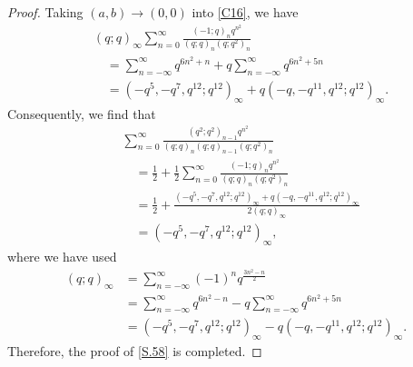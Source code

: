 \documentclass[reqno,12pt]{amsart}
\theoremstyle{remark}
\numberwithin{equation}{section}
\begin{document}
\begin{proof}
Taking $\left(a,b\right)\to\left(0,0\right)$ into \eqref{C16}, we have
\begin{align}
&\left(q;q\right)_{\infty}\sum_{n=0}^{\infty}
\frac{\left(-1;q\right)_nq^{n^2}}
{\left(q;q\right)_n\left(q;q^2\right)_n}\nonumber\\
&\quad=
\sum_{n=-\infty}^{\infty}q^{6n^2+n}+q\sum_{n=-\infty}^{\infty}q^{6n^2+5n}\nonumber\\
&\quad=
\left(-q^5,-q^7,q^{12};q^{12}\right)_{\infty}
+q\left(-q,-q^{11},q^{12};q^{12}\right)_{\infty}.
\label{equ5}
\end{align}
Consequently, we find that
\begin{align*}
&\sum_{n=0}^{\infty}\frac{\left(q^2;q^2\right)_{n-1}q^{n^2}}
{\left(q;q\right)_n\left(q;q\right)_{n-1}\left(q;q^2\right)_n}\nonumber\\
&\quad=\frac{1}{2}+\frac{1}{2}\sum_{n=0}^{\infty}
\frac{\left(-1;q\right)_nq^{n^2}}{\left(q;q\right)_n
\left(q;q^2\right)_n}\nonumber\\
&\quad=\frac{1}{2}+\frac{\left(-q^5,-q^7,q^{12};q^{12}\right)_{\infty}
+q\left(-q,-q^{11},q^{12};q^{12}\right)_{\infty}}{2\left(q;q\right)_{\infty}}\\
&\quad=\left(-q^5,-q^7,q^{12};q^{12}\right)_{\infty},
\end{align*}
where we have used
\begin{align*}
\left(q;q\right)_{\infty}
&=\sum_{n=-\infty}^{\infty}\left(-1\right)^nq^{\frac{3n^2-n}{2}}\nonumber\\
&=\sum_{n=-\infty}^{\infty}q^{6n^2-n}-q\sum_{n=-\infty}^{\infty}q^{6n^2+5n}\nonumber\\
&=\left(-q^5,-q^7,q^{12};q^{12}\right)_{\infty}
-q\left(-q,-q^{11},q^{12};q^{12}\right)_{\infty}.
\end{align*}
Therefore, the proof of \eqref{S.58} is completed.


\end{proof}
\end{document}
